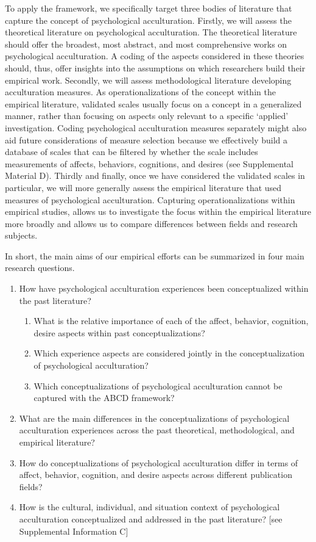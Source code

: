 \documentclass[man, 12pt, a4paper, mask]{apa7}
\begin{document}
To apply the framework, we specifically target three bodies of literature that capture the concept of psychological acculturation. Firstly, we will assess the theoretical literature on psychological acculturation. The theoretical literature should offer the broadest, most abstract, and most comprehensive works on psychological acculturation. A coding of the aspects considered in these theories should, thus, offer insights into the assumptions on which researchers build their empirical work.
Secondly, we will assess methodological literature developing acculturation measures. As operationalizations of the concept within the empirical literature, validated scales usually focus on a concept in a generalized manner, rather than focusing on aspects only relevant to a specific `applied' investigation. Coding psychological acculturation measures separately might also aid future considerations of measure selection because we effectively build a database of scales that can be filtered by whether the scale includes measurements of affects, behaviors, cognitions, and desires (see Supplemental Material D). 
Thirdly and finally, once we have considered the validated scales in particular, we will more generally assess the empirical literature that used measures of psychological acculturation. Capturing operationalizations within empirical studies, allows us to investigate the focus within the empirical literature more broadly and allows us to compare differences between fields and research subjects.

\color{blue}
In short, the main aims of our empirical efforts can be summarized in four main research questions.
\begin{enumerate}[noitemsep,topsep=0pt,label=RQ \arabic*:,leftmargin=1.8cm]
    \item How have psychological acculturation experiences been conceptualized within the past literature?
    \begin{enumerate}[noitemsep,topsep=0pt,label=(RQ 1\alph*):,leftmargin=1.64cm]
        \item What is the relative importance of each of the affect, behavior, cognition, desire aspects within past conceptualizations?
        \item Which experience aspects are considered jointly in the conceptualization of psychological acculturation?
        \item Which conceptualizations of psychological acculturation cannot be captured with the ABCD framework?
    \end{enumerate}
    \item What are the main differences in the conceptualizations of psychological acculturation experiences across the past theoretical, methodological, and empirical literature?
    \item How do conceptualizations of psychological acculturation differ in terms of affect, behavior, cognition, and desire aspects across different publication fields?
    \item How is the cultural, individual, and situation context of psychological acculturation conceptualized and addressed in the past literature? [see Supplemental Information C]
\end{enumerate}
\end{document}
